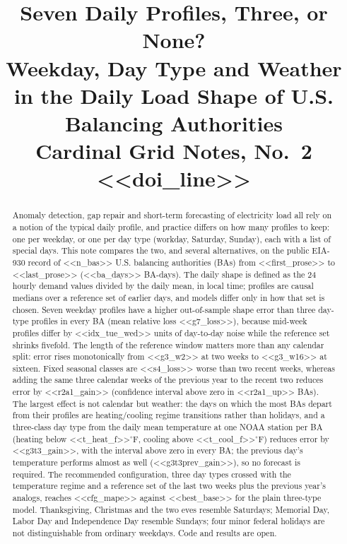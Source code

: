 \documentclass[conference]{IEEEtran}
\begin{document}
\title{Seven Daily Profiles, Three, or None?\\ Weekday, Day Type and Weather in the Daily Load Shape of U.S. Balancing Authorities\\
\large Cardinal Grid Notes, No.\ 2 \quad <<doi_line>>}

\author{
}

\maketitle

\begin{abstract}
Anomaly detection, gap repair and short-term forecasting of electricity load all rely on a notion of the typical daily profile, and practice differs on how many profiles to keep: one per weekday, or one per day type (workday, Saturday, Sunday), each with a list of special days. This note compares the two, and several alternatives, on the public EIA-930 record of <<n_bas>> U.S. balancing authorities (BAs) from <<first_prose>> to <<last_prose>> (<<ba_days>> BA-days). The daily shape is defined as the 24 hourly demand values divided by the daily mean, in local time; profiles are causal medians over a reference set of earlier days, and models differ only in how that set is chosen. Seven weekday profiles have a higher out-of-sample shape error than three day-type profiles in every BA (mean relative loss <<g7_loss>>), because mid-week profiles differ by <<idx_tue_wed>> units of day-to-day noise while the reference set shrinks fivefold. The length of the reference window matters more than any calendar split: error rises monotonically from <<g3_w2>> at two weeks to <<g3_w16>> at sixteen. Fixed seasonal classes are <<s4_loss>> worse than two recent weeks, whereas adding the same three calendar weeks of the previous year to the recent two reduces error by <<r2a1_gain>> (confidence interval above zero in <<r2a1_up>> BAs). The largest effect is not calendar but weather: the days on which the most BAs depart from their profiles are heating/cooling regime transitions rather than holidays, and a three-class day type from the daily mean temperature at one NOAA station per BA (heating below <<t_heat_f>>$^\circ$F, cooling above <<t_cool_f>>$^\circ$F) reduces error by <<g3t3_gain>>, with the interval above zero in every BA; the previous day's temperature performs almost as well (<<g3t3prev_gain>>), so no forecast is required. The recommended configuration, three day types crossed with the temperature regime and a reference set of the last two weeks plus the previous year's analogs, reaches <<cfg_mape>> against <<best_base>> for the plain three-type model. Thanksgiving, Christmas and the two eves resemble Saturdays; Memorial Day, Labor Day and Independence Day resemble Sundays; four minor federal holidays are not distinguishable from ordinary weekdays. Code and results are open.
\end{abstract}
\end{document}
